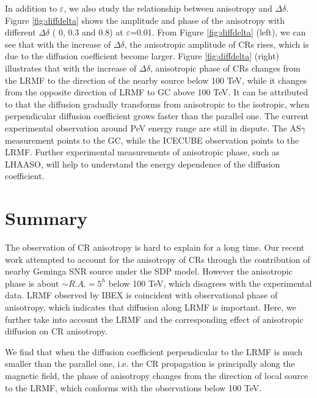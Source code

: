 \documentclass[a4paper,11pt]{article}
\begin{document}
In addition to  $\varepsilon$, we also study the  relationship between anisotropy and $\Delta\delta$.  Figure \ref{fig:diffdelta} shows the amplitude and phase of the anisotropy with different $\Delta\delta$ ( 0, 0.3 and 0.8) at $\varepsilon$=0.01. %
From  Figure \ref{fig:diffdelta} (left), we can see that with the increase of $\Delta\delta$, the  anisotropic amplitude of CRs rises, which is due to the diffusion coefficient become larger.
Figure \ref{fig:diffdelta} (right) illustrates that with the increase of $\Delta\delta$, anisotropic phase of CRs changes from  the LRMF to the direction of the nearby source below 100 TeV, while it changes from the opposite direction of LRMF to GC above 100 TeV.  It can be attributed to that the diffusion gradually transforms from anisotropic to the isotropic,  when perpendicular diffusion coefficient grows faster than the parallel one.
The current  experimental  observation around PeV energy range are still in dispute. The AS$\gamma$ measurement points to the GC, while the ICECUBE observation points to the LRMF. Further experimental measurements of anisotropic phase, such as LHAASO, will help to understand the energy dependence of the diffusion coefficient.


\section{Summary}\label{sec:summary}

The observation of CR  anisotropy  is hard to explain for a long time.
Our recent work attempted to account for the anisotropy of  CRs through the contribution of nearby Geminga SNR source under the SDP model. However the  anisotropic phase is about $\sim R.A.= 5^h$ below 100 TeV, which disagrees with  the experimental data.  
LRMF observed by IBEX  is coincident with observational phase of anisotropy, which indicates that diffusion along LRMF is important. Here, we further take into account the  LRMF and the corresponding effect of anisotropic diffusion on CR anisotropy. 

We find that when the diffusion coefficient  perpendicular to the LRMF is much smaller than the parallel one, i.e. the CR propagation is principally along the magnetic field, the phase of anisotropy  changes from the direction of local source to the LRMF, which conforms with the observations below 100 TeV.
\end{document}
